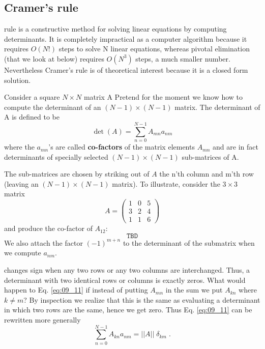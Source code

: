\subsection{Cramer's rule}

 rule is a constructive method for solving linear equations
by computing determinants. It is completely impractical
as a computer algorithm because it requires $O(N!)$ steps to solve
N linear equations, whereas pivotal elimination (that we look at
below) requires $O(N^3)$ steps, a much smaller number. Nevertheless Cramer's
rule is of theoretical interest because it is a closed form solution.

Consider a square $N\times N$ matrix A Pretend for the moment we
know how to compute the determinant of an $(N-1)\times(N-1)$
matrix. The determinant of A is defined to be
\begin{equation}
    \label{eq:09_10}
    \det(A) = \sum_{n=0}^{N-1}A_{mn} a_{nm} 
\end{equation}
where the $a_{mn}$'s are called \textbf{co-factors} of the matrix elements $A_{mn}$
and are in fact determinants of specially selected $(N-1)\times(N-1)$
sub-matrices of A.

The sub-matrices are chosen by striking out of $A$ the n'th column
and m'th row (leaving an $(N-1)\times(N-1)$ matrix). To illustrate,
consider the $3 \times 3$ matrix
\begin{equation}
    \label{eq:09_11}
    A = 
    \begin{pmatrix}
        1 & 0 & 5\\ 
        3 & 2 & 4\\ 
        1 & 1 & 6
    \end{pmatrix}
\end{equation}
and produce the co-factor of $A_{12}$:
\begin{equation}
    \texttt{TBD}\label{eq:09_12}
\end{equation}
We also attach the factor $(-1)^{m+n}$ to the determinant of the
submatrix when we compute $a_{nm}$.

 changes sign when any two rows or any two 
columns are interchanged. Thus, a determinant with two identical rows or
columns is exactly zeros. What would happen to
Eq. \ref{eq:09_11} if instead of putting $A_{mn}$ in the sum we put $A_{kn}$ where
$k\neq m$? By inspection we realize that this is the same as evaluating
a determinant in which two rows are the same, hence we get zero.
Thus Eq. \ref{eq:09_11} can be rewritten more generally
\begin{equation}
    \sum_{n=0}^{N-1}A_{kn}a_{nm}=||A||\;\delta_{km}\;.\label{eq:09_13}
\end{equation}

